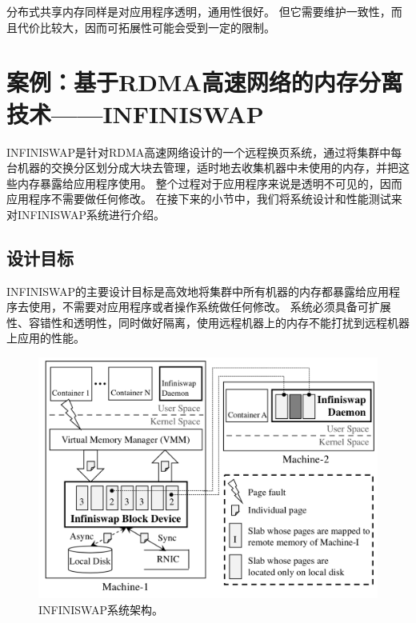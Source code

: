 分布式共享内存同样是对应用程序透明，通用性很好。
但它需要维护一致性，而且代价比较大，因而可拓展性可能会受到一定的限制。



\section{案例：基于RDMA高速网络的内存分离技术——INFINISWAP}

INFINISWAP是针对RDMA高速网络设计的一个远程换页系统，通过将集群中每台机器的交换分区划分成大块去管理，适时地去收集机器中未使用的内存，并把这些内存暴露给应用程序使用。
整个过程对于应用程序来说是透明不可见的，因而应用程序不需要做任何修改。
在接下来的小节中，我们将系统设计和性能测试来对INFINISWAP系统进行介绍。

\subsection{设计目标}
INFINISWAP的主要设计目标是高效地将集群中所有机器的内存都暴露给应用程序去使用，不需要对应用程序或者操作系统做任何修改。
系统必须具备可扩展性、容错性和透明性，同时做好隔离，使用远程机器上的内存不能打扰到远程机器上应用的性能。

\begin{figure}
\centering
\includegraphics[scale=0.5]{Figures/memory/infiniswap_architecture.png}
\decoRule
\caption{INFINISWAP系统架构。\cite{gu2017efficient}}
\label{fig:infiniswap_architecture}
\end{figure}

